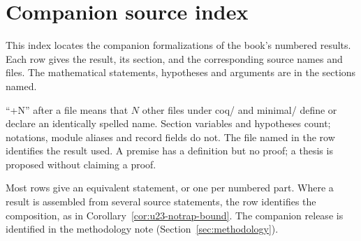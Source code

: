\section{Companion source index}
\label{sec:crosswalk}

This index locates the companion formalizations of the book's numbered results.
Each row gives the result, its section, and the corresponding source names and files.
The mathematical statements, hypotheses and arguments are in the sections named.

``+N'' after a file means that $N$ other files under coq/ and minimal/ define or declare
an identically spelled name. Section variables and hypotheses count; notations, module
aliases and record fields do not. The file named in the row identifies the result used.
A premise has a definition but no proof; a thesis is proposed without claiming a proof.

Most rows give an equivalent statement, or one per numbered part. Where a result is
assembled from several source statements, the row identifies the composition, as in
Corollary~\ref{cor:u23-notrap-bound}. The companion release is identified in the
methodology note (Section~\ref{sec:methodology}).

